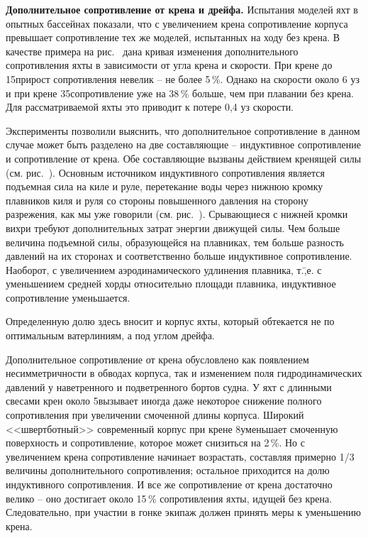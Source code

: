 \textbf{Дополнительное сопротивление от крена и дрейфа.} Испытания моделей яхт в опытных бассейнах показали, что с увеличением крена сопротивление корпуса превышает сопротивление тех же моделей, испытанных на ходу без крена. В качестве примера на рис.~ дана кривая изменения дополнительного сопротивления яхты в зависимости от угла крена и скорости. При крене до 15\gr прирост сопротивления невелик \--- не более 5\,\%. Однако на скорости около 6 уз и при крене 35\gr сопротивление уже на 38\,\% больше, чем при плавании без крена. Для рассматриваемой яхты это приводит к потере 0,4 уз скорости. 

Эксперименты позволили выяснить, что дополнительное сопротивление в данном случае может быть разделено на две составляющие \--- индуктивное сопротивление и сопротивление от крена. Обе составляющие вызваны действием кренящей силы  (см. рис.~). Основным источником индуктивного сопротивления является подъемная сила на киле и руле, перетекание воды через нижнюю кромку плавников киля и руля со стороны повышенного давления на сторону разрежения, как мы уже говорили (см. рис.~). Срывающиеся с нижней кромки вихри требуют дополнительных затрат энергии движущей силы. Чем больше величина подъемной силы, образующейся на плавниках, тем больше разность давлений на их сторонах и соответственно больше индуктивное сопротивление. Наоборот, с увеличением аэродинамического удлинения плавника, т.\=,е. с уменьшением средней хорды относительно площади плавника, индуктивное сопротивление уменьшается. 

Определенную долю здесь вносит и корпус яхты, который обтекается не по оптимальным ватерлиниям, а под углом дрейфа. 

Дополнительное сопротивление от крена обусловлено как появлением несимметричности в обводах корпуса, так и изменением поля гидродинамических давлений у наветренного и подветренного бортов судна. У яхт с длинными свесами крен около 5\gr вызывает иногда даже некоторое снижение полного сопротивления при увеличении смоченной длины корпуса. Широкий <<швертботный>> современный корпус при крене 8\gr уменьшает смоченную поверхность и сопротивление, которое может снизиться на 2\,\%. Но с увеличением крена сопротивление начинает возрастать, составляя примерно 1/3 величины дополнительного сопротивления; остальное приходится на долю индуктивного сопротивления. И все же сопротивление от крена достаточно велико \--- оно достигает около 15\,\% сопротивления яхты, идущей без крена. Следовательно, при участии в гонке экипаж должен принять меры к уменьшению крена.

